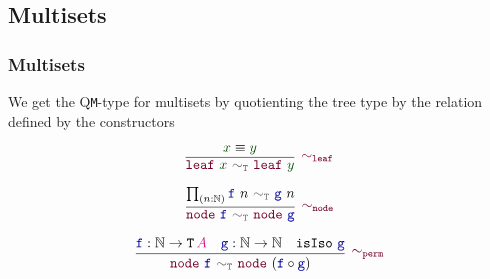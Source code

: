 \documentclass[xelatex,mathserif,serif,notheorems]{beamer} %
\theoremstyle{plain} %
\theoremstyle{definition}
\theoremstyle{remark}
\newcommand*{\term}[1]{\textcolor{green!30!black}{#1}} %
\newcommand*{\type}[1]{\textcolor{magenta!90!black}{#1}}
\newcommand*{\relation}[1]{\textcolor{gray!75!black}{\ensuremath{\mathtt{#1}}}}
\newcommand*{\function}[1]{\textcolor{blue!60!black}{\ensuremath{\mathtt{#1}}}}
\newcommand*{\constructor}[1]{\textcolor{purple!60!black}{\ensuremath{\mathtt{#1}}}}
\newcommand*{\typeformer}[1]{\ensuremath{\mathtt{#1}}}
\begin{document}
\subsection{Multisets}
\begin{frame}
  \frametitle{Multisets}
  We get the Q\texttt{M}-type for multisets by quotienting the tree type by the relation defined by the constructors\\
  \strut
  \hfill
  \begin{minipage}{0.35\linewidth}
    \begin{equation}
      \vcenter{\infer[\constructor{\sim_{leaf}}]{\constructor{leaf}~\term{x}~\relation{\sim_{T}}~\constructor{leaf}~\term{y}}{\term{x} \equiv \term{y}}}
    \end{equation}
  \end{minipage}
  \hfill
  \begin{minipage}{0.35\linewidth}
    \begin{equation}
      \vcenter{\infer[\constructor{\sim_{node}}]{\constructor{node}~\function{f}~\relation{\sim_T}~\constructor{node}~\function{g}}{\prod_{(n : \mathbb{N})} \function{f}~n~\relation{\sim_T}~\function{g}~n}}
    \end{equation}
  \end{minipage}
  \hfill
  \strut
  \begin{equation}
    \vcenter{\infer[\constructor{\sim_{perm}}]{\constructor{node}~\function{f}~\relation{\sim_T}~\constructor{node}~(\function{f} \circ \function{g})}{\function{f} : \mathbb{N} \rightarrow \typeformer{T}\,\type{A} & \function{g} : \mathbb{N} \rightarrow \mathbb{N} & \mathtt{isIso}~\function{g}}}
  \end{equation}
\end{frame}
\end{document}
